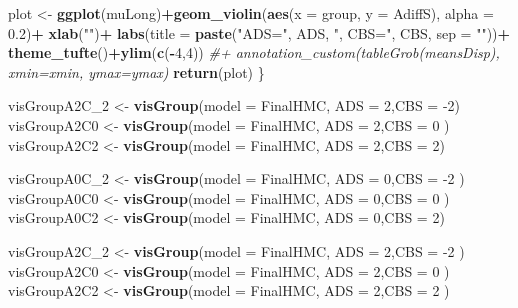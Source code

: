\documentclass[10pt,dvipsnames,enabledeprecatedfontcommands]{scrartcl}
\newenvironment{Shaded}{\begin{snugshade}}{\end{snugshade}}
\newcommand{\KeywordTok}[1]{\textcolor[rgb]{0.13,0.29,0.53}{\textbf{#1}}}
\newcommand{\DataTypeTok}[1]{\textcolor[rgb]{0.13,0.29,0.53}{#1}}
\newcommand{\DecValTok}[1]{\textcolor[rgb]{0.00,0.00,0.81}{#1}}
\newcommand{\FloatTok}[1]{\textcolor[rgb]{0.00,0.00,0.81}{#1}}
\newcommand{\StringTok}[1]{\textcolor[rgb]{0.31,0.60,0.02}{#1}}
\newcommand{\CommentTok}[1]{\textcolor[rgb]{0.56,0.35,0.01}{\textit{#1}}}
\newcommand{\OperatorTok}[1]{\textcolor[rgb]{0.81,0.36,0.00}{\textbf{#1}}}
\newcommand{\NormalTok}[1]{#1}
\begin{document}
\begin{Shaded}
\begin{Highlighting}[]
\NormalTok{plot <-}\StringTok{ }\KeywordTok{ggplot}\NormalTok{(muLong)}\OperatorTok{+}\KeywordTok{geom_violin}\NormalTok{(}\KeywordTok{aes}\NormalTok{(}\DataTypeTok{x =}\NormalTok{ group, }\DataTypeTok{y =}\NormalTok{ AdiffS), }\DataTypeTok{alpha =} \FloatTok{0.2}\NormalTok{)}\OperatorTok{+}
\StringTok{  }\KeywordTok{xlab}\NormalTok{(}\StringTok{""}\NormalTok{)}\OperatorTok{+}
\StringTok{  }\KeywordTok{labs}\NormalTok{(}\DataTypeTok{title =} \KeywordTok{paste}\NormalTok{(}\StringTok{"ADS="}\NormalTok{, ADS, }\StringTok{", CBS="}\NormalTok{,  CBS,  }\DataTypeTok{sep =} \StringTok{""}\NormalTok{))}\OperatorTok{+}
\StringTok{  }\KeywordTok{theme_tufte}\NormalTok{()}\OperatorTok{+}\KeywordTok{ylim}\NormalTok{(}\KeywordTok{c}\NormalTok{(}\OperatorTok{-}\DecValTok{4}\NormalTok{,}\DecValTok{4}\NormalTok{))}
\CommentTok{#+   annotation_custom(tableGrob(meansDisp), xmin=xmin,  ymax=ymax)}
\KeywordTok{return}\NormalTok{(plot)}
\NormalTok{\}}


\NormalTok{visGroupA2C_}\DecValTok{2}\NormalTok{ <-}\StringTok{ }\KeywordTok{visGroup}\NormalTok{(}\DataTypeTok{model =}\NormalTok{ FinalHMC, }\DataTypeTok{ADS =} \DecValTok{2}\NormalTok{,}\DataTypeTok{CBS =} \DecValTok{-2}\NormalTok{)}
\NormalTok{visGroupA2C0 <-}\StringTok{ }\KeywordTok{visGroup}\NormalTok{(}\DataTypeTok{model =}\NormalTok{ FinalHMC, }\DataTypeTok{ADS =} \DecValTok{2}\NormalTok{,}\DataTypeTok{CBS =} \DecValTok{0}\NormalTok{ )}
\NormalTok{visGroupA2C2 <-}\StringTok{ }\KeywordTok{visGroup}\NormalTok{(}\DataTypeTok{model =}\NormalTok{ FinalHMC, }\DataTypeTok{ADS =} \DecValTok{2}\NormalTok{,}\DataTypeTok{CBS =} \DecValTok{2}\NormalTok{)}

\NormalTok{visGroupA0C_}\DecValTok{2}\NormalTok{ <-}\StringTok{ }\KeywordTok{visGroup}\NormalTok{(}\DataTypeTok{model =}\NormalTok{ FinalHMC, }\DataTypeTok{ADS =} \DecValTok{0}\NormalTok{,}\DataTypeTok{CBS =} \DecValTok{-2}\NormalTok{ )}
\NormalTok{visGroupA0C0 <-}\StringTok{ }\KeywordTok{visGroup}\NormalTok{(}\DataTypeTok{model =}\NormalTok{ FinalHMC, }\DataTypeTok{ADS =} \DecValTok{0}\NormalTok{,}\DataTypeTok{CBS =} \DecValTok{0}\NormalTok{ )}
\NormalTok{visGroupA0C2 <-}\StringTok{  }\KeywordTok{visGroup}\NormalTok{(}\DataTypeTok{model =}\NormalTok{ FinalHMC, }\DataTypeTok{ADS =} \DecValTok{0}\NormalTok{,}\DataTypeTok{CBS =} \DecValTok{2}\NormalTok{)}

\NormalTok{visGroupA2C_}\DecValTok{2}\NormalTok{ <-}\StringTok{  }\KeywordTok{visGroup}\NormalTok{(}\DataTypeTok{model =}\NormalTok{ FinalHMC, }\DataTypeTok{ADS =} \DecValTok{2}\NormalTok{,}\DataTypeTok{CBS =} \DecValTok{-2}\NormalTok{ )}
\NormalTok{visGroupA2C0 <-}\StringTok{ }\KeywordTok{visGroup}\NormalTok{(}\DataTypeTok{model =}\NormalTok{ FinalHMC, }\DataTypeTok{ADS =} \DecValTok{2}\NormalTok{,}\DataTypeTok{CBS =} \DecValTok{0}\NormalTok{ )}
\NormalTok{visGroupA2C2 <-}\StringTok{ }\KeywordTok{visGroup}\NormalTok{(}\DataTypeTok{model =}\NormalTok{ FinalHMC, }\DataTypeTok{ADS =} \DecValTok{2}\NormalTok{,}\DataTypeTok{CBS =} \DecValTok{2}\NormalTok{ )}


\end{Highlighting}
\end{Shaded}
\end{document}
